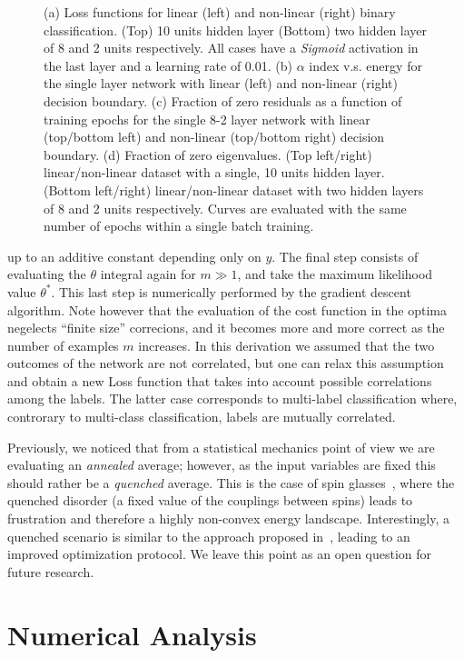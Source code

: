\documentclass{article}
\begin{document}
\begin{figure}[t!]
	\caption{ \label{fig:index} (a) Loss functions for linear (left) and non-linear (right) binary classification. (Top) 10 units hidden layer (Bottom) two hidden layer of 8 and 2 units respectively. All cases have a {\it Sigmoid} activation in the last layer and a learning rate of 0.01. (b) $\alpha$ index  v.s. energy for the single layer network with linear (left) and non-linear (right) decision boundary. (c)  Fraction of zero residuals as a function of training epochs for the single 8-2 layer network with linear (top/bottom left) and non-linear (top/bottom right) decision boundary. (d) Fraction of zero eigenvalues. (Top left/right) linear/non-linear dataset with a single, 10 units hidden layer. (Bottom left/right)  linear/non-linear dataset with two hidden layers of 8 and 2 units respectively. Curves are evaluated with the same number of epochs within a single batch training. }
\end{figure}
%
up to an additive constant depending only on $y$. The final step consists of evaluating the $\theta$ integral again for $m \gg 1$, and take the maximum likelihood value $\theta^*$. This last step is numerically performed by the gradient descent algorithm. Note however that the evaluation of the cost function in the optima negelects ``finite size'' correcions, and it becomes more and more correct as the number of examples $m$ increases. In this derivation we assumed that the two outcomes of the network are not correlated, but one can relax this assumption and obtain a new Loss function that takes into account possible correlations among the labels. The latter case corresponds to multi-label classification where, controrary to multi-class classification, labels are mutually correlated.

Previously, we noticed that from a statistical mechanics point of view we are evaluating an {\it annealed} average; however, as the input variables are fixed this should rather be a {\it quenched} average. This is the case of spin glasses~\cite{parisi2, giardina}, where the quenched disorder (a fixed value of the couplings between spins) leads to frustration and therefore a highly non-convex energy landscape. Interestingly, a quenched scenario is similar to the approach proposed in~\cite{pratik}, leading to an improved optimization protocol. We leave this point as an open question for future research.

\section{Numerical Analysis} \label{a:numerical}
\end{document}
